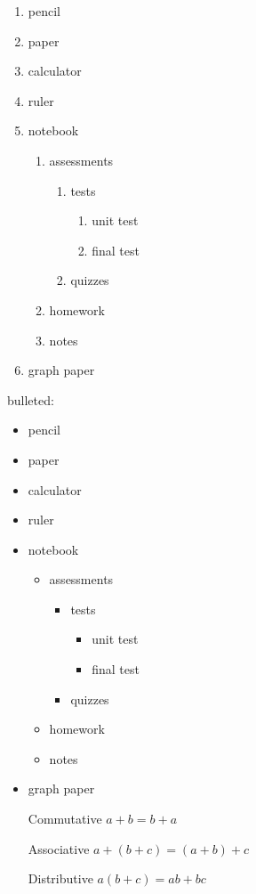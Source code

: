 \documentclass[11pt]{article}
\begin{document}
\begin{enumerate}

\item pencil
\item paper
\item calculator
\item ruler
\item notebook
	\begin{enumerate}
	\item assessments
		\begin{enumerate}
			\item tests
				\begin{enumerate}
				\item unit test
				\item final test
				\end{enumerate}
			\item quizzes
		\end{enumerate}
	\item homework
	\item notes
	\end{enumerate}
\item graph paper
\end{enumerate}

bulleted:
\begin{itemize}
\item pencil
\item paper
\item calculator
\item ruler
\item notebook
	\begin{itemize}
	\item assessments
		\begin{itemize}
			\item tests
				\begin{itemize}
				\item unit test
				\item final test
				\end{itemize}
			\item quizzes
		\end{itemize}
	\item homework
	\item notes
	\end{itemize}
\item graph paper
\end{itemize}


\begin{enumerate}
\item[Commutative] $a+b=b+a$
\item[Associative] $a+(b+c)= (a+b)+c$
\item[Distributive] $a(b+c)=ab+bc$
\end{enumerate}
\end{document}
